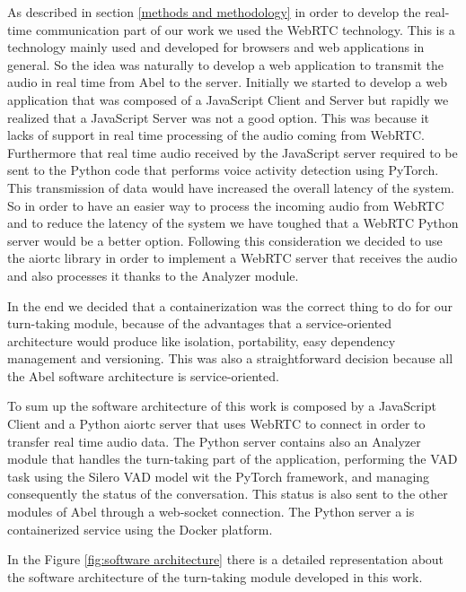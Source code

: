 \documentclass[../main.tex]{subfiles}
\begin{document}
As described in section \ref{methods and methodology} in order to develop the real-time communication part of our work we used the WebRTC technology. This is a technology mainly used and developed for browsers and web applications in general. So the idea was naturally to develop a web application to transmit the audio in real time from Abel to the server. Initially we started to develop a web application that was composed of a JavaScript Client and Server but rapidly we realized that a JavaScript Server was not a good option. This was because it lacks of support in real time processing of the audio coming from WebRTC. Furthermore that real time audio received by the JavaScript server required to be sent to the Python code that performs voice activity detection using PyTorch. This transmission of data would have increased the overall latency of the system. So in order to have an easier way to process the incoming audio from WebRTC and to reduce the latency of the system we have toughed that a WebRTC Python server would be a better option. Following this consideration we decided to use the aiortc library in order to implement a WebRTC server that receives the audio and also processes it thanks to the Analyzer module. 

In the end we decided that a containerization was the correct thing to do for our turn-taking module, because of the advantages that a service-oriented architecture would produce like isolation, portability, easy dependency management and versioning. This was also a straightforward decision because all the Abel software architecture is service-oriented. 

To sum up the software architecture of this work is composed by a JavaScript Client and a Python aiortc server that uses WebRTC to connect in order to transfer real time audio data. The Python server contains also an Analyzer module that handles the turn-taking part of the application, performing the VAD task using the Silero VAD model wit the PyTorch framework, and managing consequently the status of the conversation. This status is also sent to the other modules of Abel through a web-socket connection. The Python server a is containerized service using the Docker platform.

In the Figure \ref{fig:software architecture} there is a detailed representation about the software architecture of the turn-taking module developed in this work.
\end{document}

